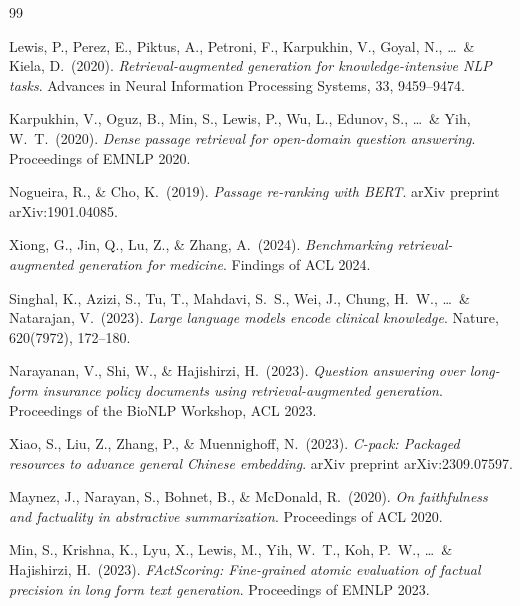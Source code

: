 \documentclass[10pt, letterpaper]{article}
\begin{document}

\begin{thebibliography}{99}

Lewis, P., Perez, E., Piktus, A., Petroni, F., Karpukhin, V., Goyal, N., \ldots\ \& Kiela, D.\ (2020).
\textit{Retrieval-augmented generation for knowledge-intensive NLP tasks}.
Advances in Neural Information Processing Systems, 33, 9459--9474.

Karpukhin, V., Oguz, B., Min, S., Lewis, P., Wu, L., Edunov, S., \ldots\ \& Yih, W.\ T.\ (2020).
\textit{Dense passage retrieval for open-domain question answering}.
Proceedings of EMNLP 2020.

Nogueira, R., \& Cho, K.\ (2019).
\textit{Passage re-ranking with BERT}.
arXiv preprint arXiv:1901.04085.

Xiong, G., Jin, Q., Lu, Z., \& Zhang, A.\ (2024).
\textit{Benchmarking retrieval-augmented generation for medicine}.
Findings of ACL 2024.

Singhal, K., Azizi, S., Tu, T., Mahdavi, S.\ S., Wei, J., Chung, H.\ W., \ldots\ \& Natarajan, V.\ (2023).
\textit{Large language models encode clinical knowledge}.
Nature, 620(7972), 172--180.

Narayanan, V., Shi, W., \& Hajishirzi, H.\ (2023).
\textit{Question answering over long-form insurance policy documents using retrieval-augmented generation}.
Proceedings of the BioNLP Workshop, ACL 2023.

Xiao, S., Liu, Z., Zhang, P., \& Muennighoff, N.\ (2023).
\textit{C-pack: Packaged resources to advance general Chinese embedding}.
arXiv preprint arXiv:2309.07597.

Maynez, J., Narayan, S., Bohnet, B., \& McDonald, R.\ (2020).
\textit{On faithfulness and factuality in abstractive summarization}.
Proceedings of ACL 2020.

Min, S., Krishna, K., Lyu, X., Lewis, M., Yih, W.\ T., Koh, P.\ W., \ldots\ \& Hajishirzi, H.\ (2023).
\textit{FActScoring: Fine-grained atomic evaluation of factual precision in long form text generation}.
Proceedings of EMNLP 2023.

\end{thebibliography}
\end{document}
